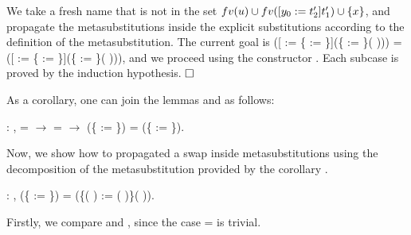 We take a fresh name  that is not in the set $fv(u)\cup fv(\esub{t_1'}{y_0}{t_2'})\cup \{ x \}$, and propagate the metasubstitutions inside the explicit substitutions according to the definition of the metasubstitution. The current goal is ([ := \{ := \}](\{ := \}(   ))) =
  ([ := \{ := \}](\{ := \}(   ))), and we proceed using the constructor . Each subcase is proved by the induction hypothesis. $\hfill\Box$\begin{coqdoccode}
 \coqdocemptyline
\end{coqdoccode}
As a corollary, one can join the lemmas  and  as follows:
\begin{coqdoccode}
\coqdocemptyline
\coqdocnoindent
{} : \coqdockw{\ensuremath{\forall}}     ,  =  \ensuremath{\rightarrow}  =  \ensuremath{\rightarrow} (\{ := \}) = (\{ := \}).\coqdoceol
\coqdocemptyline
\end{coqdoccode}
Now, we show how to propagated a swap inside metasubstitutions using the decomposition of the metasubstitution provided by the corollary .\newline 
\begin{coqdoccode}
\coqdocemptyline
\coqdocnoindent
{} : \coqdockw{\ensuremath{\forall}}     ,    (\{ := \}) = (\{(   ) := (   )\}(   )).\coqdoceol
\end{coqdoccode}
 Firstly, we compare  and , since the case  =  is trivial.
\begin{coqdoccode}
\end{coqdoccode}
